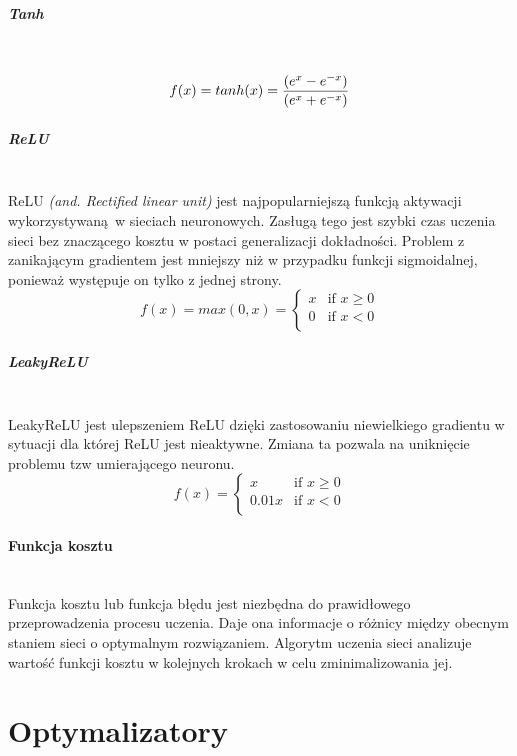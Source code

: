 \subparagraph{Tanh} \mbox{}\\
\begin{equation}
f(x) = tanh(x) = \frac{(e^x - e^{-x})}{(e^x + e^{-x})} \\
\end{equation}

\subparagraph{ReLU} \mbox{}\\
ReLU \textit{(and. Rectified linear unit)} jest najpopularniejszą funkcją aktywacji
wykorzystywaną w sieciach neuronowych. Zasługą tego jest szybki czas uczenia sieci
bez znaczącego kosztu w postaci generalizacji dokładności. Problem z zanikającym
gradientem jest mniejszy niż w przypadku funkcji sigmoidalnej, ponieważ występuje
on tylko z jednej strony.
\begin{equation}
f(x) = max(0, x) =
\begin{cases}
 x & \text{if } x \geqslant 0 \\
 0 & \text{if } x < 0 \\
\end{cases}
\end{equation}

\subparagraph{LeakyReLU} \mbox{}\\
LeakyReLU jest ulepszeniem ReLU dzięki zastosowaniu niewielkiego gradientu w sytuacji
dla której ReLU jest nieaktywne. Zmiana ta pozwala na uniknięcie problemu tzw
umierającego neuronu.
\begin{equation}
f(x) =
\begin{cases}
 x & \text{if } x \geqslant 0 \\
 0.01x & \text{if } x < 0 \\
\end{cases}
\end{equation}

\paragraph{Funkcja kosztu} \mbox{}\\
Funkcja kosztu lub funkcja błędu jest niezbędna do prawidłowego przeprowadzenia
procesu uczenia. Daje ona informacje o różnicy między obecnym staniem sieci o
optymalnym rozwiązaniem. Algorytm uczenia sieci analizuje wartość funkcji kosztu
w kolejnych krokach w celu zminimalizowania jej.

\section{Optymalizatory}

